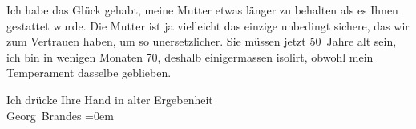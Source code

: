 \pstart
           Ich habe das Glück gehabt, meine Mutter etwas länger zu behalten als es Ihnen gestattet wurde. Die Mutter ist
               ja vielleicht das einzige unbedingt sichere, das wir zum Vertrauen haben, um so
               unersetzlicher. Sie müssen jetzt 50 Jahre alt sein, ich bin in wenigen Monaten 70,
               deshalb einigermassen isolirt, obwohl mein Temperament dasselbe geblieben.\pend
           
\pstart
           Ich drücke Ihre Hand in alter Ergebenheit{\\[\baselineskip]}\spacefill\mbox{Georg Brandes}\pend
           \leftskip=0em{}\endnumbering{}  \newcommand{\dateiname}{L02040}\newcommand{\titel}{Georg Brandes an Arthur Schnitzler, 19. 10. 1911}\newcommand{\editorInnen}{Martin Anton Müller und Gerd-Hermann Susen}
